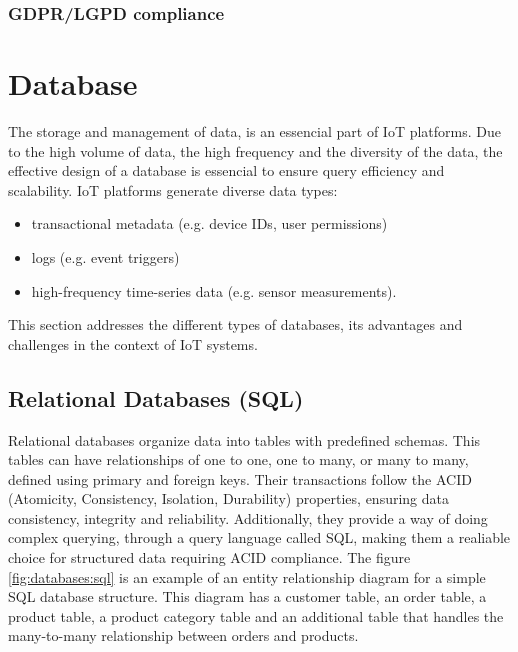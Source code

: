 \subsubsection{GDPR/LGPD compliance}


\section{Database}
The storage and management of data, is an essencial part of IoT platforms.
Due to the high volume of data, the high frequency and the diversity of the
data, the effective design of a database is essencial to ensure query efficiency
and scalability.
IoT platforms generate diverse data types:
\begin{itemize}
	\item transactional metadata (e.g. device  IDs, user permissions)
	\item logs (e.g. event triggers)
	\item high-frequency time-series data (e.g. sensor measurements).
\end{itemize}

This section addresses the different types of databases, its advantages and
challenges in the context of IoT systems.

\subsection{Relational Databases (SQL)}
Relational databases organize data into tables with predefined schemas.
This tables can have relationships of one to one, one to many, or many to many,
defined using primary and foreign keys. Their transactions follow the ACID
(Atomicity, Consistency, Isolation, Durability) properties, ensuring data
consistency, integrity and reliability. Additionally, they provide a way of
doing complex querying, through a query language called \gls{SQL}, making them
a realiable choice for structured data requiring ACID compliance. The figure
\ref{fig:databases:sql}
is an example of an entity relationship diagram for a simple SQL database structure.
This diagram has a customer table, an order table, a product table, a product
category table and an additional table that handles the many-to-many
relationship between orders and products.


